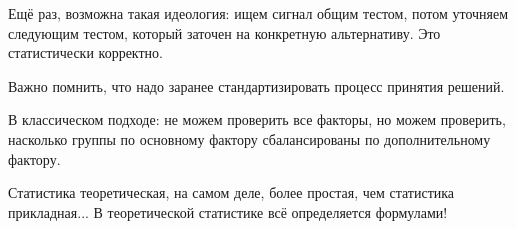 \documentclass[main.tex]{subfiles}
\begin{document}
Ещё раз, возможна такая идеология: ищем сигнал общим тестом, потом уточняем следующим тестом, который заточен на конкретную альтернативу.
Это статистически корректно.

Важно помнить, что надо заранее стандартизировать процесс принятия решений.

В классическом подходе: не можем проверить все факторы, но можем проверить, насколько группы по основному фактору сбалансированы по дополнительному фактору.

Статистика теоретическая, на самом деле, более простая, чем статистика прикладная...
В теоретической статистике всё определяется формулами!
\end{document}
